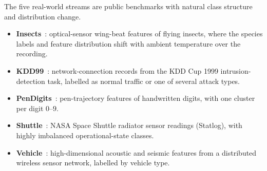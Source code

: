 \documentclass[conference]{IEEEtran}
\begin{document}
\begin{table}[t]
\centering
\caption{Summary of datasets.}
\label{tab:dataset_summary}
\end{table}

The five real-world streams are public benchmarks with natural class structure and distribution change.
\begin{itemize}
\item \textbf{Insects}~\cite{souza2020challenges}: optical-sensor wing-beat features of flying insects, where the species labels and feature distribution shift with ambient temperature over the recording.
\item \textbf{KDD99}~\cite{dua2019uci}: network-connection records from the KDD Cup 1999 intrusion-detection task, labelled as normal traffic or one of several attack types.
\item \textbf{PenDigits}~\cite{dua2019uci}: pen-trajectory features of handwritten digits, with one cluster per digit $0$--$9$.
\item \textbf{Shuttle}~\cite{dua2019uci}: NASA Space Shuttle radiator sensor readings (Statlog), with highly imbalanced operational-state classes.
\item \textbf{Vehicle}~\cite{duarte2004vehicle}: high-dimensional acoustic and seismic features from a distributed wireless sensor network, labelled by vehicle type.
\end{itemize}
\end{document}

